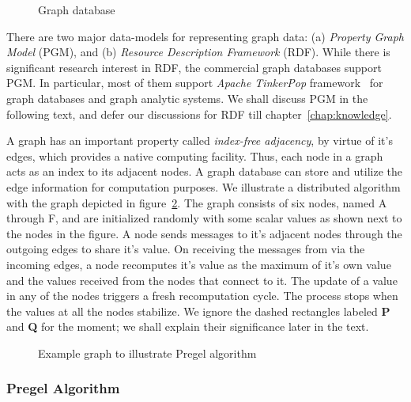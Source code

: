 \begin{figure}
	\centerline{
	}
	\caption{Graph database}
	\label{fig:bigdata:graph}
\end{figure}

 
There are two major data-models for representing graph data: (a) {\em Property Graph Model} (PGM), and (b) {\em Resource 
Description Framework} (RDF). While there is significant research interest in RDF, the commercial graph databases support PGM. 
In particular, most of them support {\em Apache TinkerPop} framework~\citep{Rodriguez:2015} for graph databases and graph analytic 
systems. We shall discuss PGM in the following text, and defer our discussions for RDF till chapter~\ref{chap:knowledge}.

A graph has an important property called {\em index-free adjacency}, by virtue of it's edges, which provides a native computing 
facility. Thus, each node in a graph acts as an index to its adjacent nodes. A graph database can store and utilize the edge 
information for computation purposes. We illustrate a distributed algorithm with the graph depicted in figure~\ref{fig:bigdata:pregel}. 
The graph consists of six nodes, named A through F, and are initialized randomly with some scalar values as shown next to the nodes
in the figure. A node sends messages to it's adjacent nodes through the outgoing edges to share it's value. On receiving the messages 
from via the incoming edges, a node recomputes it's value as the maximum of it's own value and the values received from the nodes
that connect to it. The update of a value in any of the nodes triggers a fresh recomputation cycle. The process stops when the values 
at all the nodes stabilize. We ignore the dashed rectangles labeled {\bf P} and {\bf Q} for the moment; we shall explain their 
significance later in the text.

\begin{figure}
	\centerline{
	}
	\caption{Example graph to illustrate Pregel algorithm}
	\label{fig:bigdata:pregel}
\end{figure}

\subsubsection*{Pregel Algorithm}

